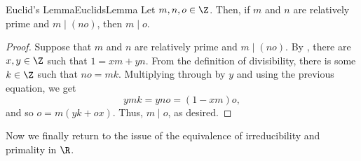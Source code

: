 \begin{prp}{Euclid's Lemma}{EuclidsLemma}
Let $m,n,o\in \Z$.  Then, if $m$ and $n$ are relatively prime and $m\mid (no)$, then $m\mid o$.
\begin{proof}
Suppose that $m$ and $n$ are relatively prime and $m\mid (no)$.  By , there are $x,y\in \Z$ such that $1=xm+yn$.  From the definition of divisibility, there is some $k\in \Z$ such that $no=mk$.  Multiplying through by $y$ and using the previous equation, we get
\begin{equation}
ymk=yno=(1-xm)o,
\end{equation}
and so $o=m(yk+ox)$.  Thus, $m\mid o$, as desired.
\end{proof}
\end{prp}

Now we finally return to the issue of the equivalence of irreducibility and primality in $\R$.
